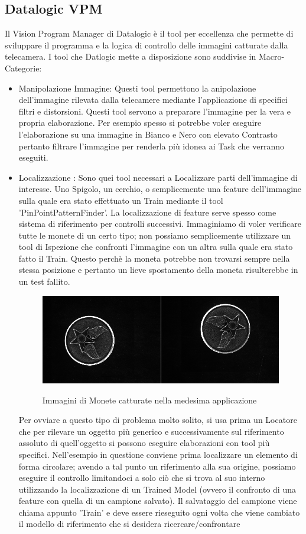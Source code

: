 \documentclass[12pt, a4paper, oneside]{book}
\begin{document}
\subsection{Datalogic VPM}
Il Vision Program Manager di Datalogic è il tool per eccellenza che permette di sviluppare il programma e la logica di controllo delle immagini catturate dalla telecamera. I tool che Datlogic mette a disposizione sono suddivise in Macro-Categorie:
\begin{itemize}
\item Manipolazione Immagine: Questi tool permettono la anipolazione dell'immagine rilevata dalla telecamere mediante l'applicazione di specifici filtri e distorsioni. Questi tool servono a preparare l'immagine per la vera e propria elaborazione. Per esempio spesso si potrebbe voler eseguire l'elaborazione su una immagine in Bianco e Nero con elevato Contrasto pertanto filtrare l'immagine per renderla più idonea ai Task che verranno eseguiti. 
	\item Localizzazione : Sono quei tool necessari a Localizzare parti dell'immagine di interesse. Uno Spigolo, un cerchio, o semplicemente una feature dell'immagine sulla quale era stato effettuato un Train mediante il tool 'PinPointPatternFinder'. La localizzazione di feature serve spesso come sistema di riferimento per controlli successivi. Immaginiamo di voler verificare tutte le monete di un certo tipo; non possiamo semplicemente utilizzare un tool di Ispezione che confronti l'immagine con un altra sulla quale era stato fatto il Train. Questo perchè la moneta potrebbe non trovarsi sempre nella stessa posizione e pertanto un lieve spostamento della moneta risulterebbe in un test fallito.
	
	\begin{figure}[H]
		\centering
		\includegraphics[width=13cm]{Immagini/VIS1}
		\label{vis1}
		\caption{Immagini di Monete catturate nella medesima applicazione}
	\end{figure}

	Per ovviare a questo tipo di problema molto solito, si usa prima un Locatore che per rilevare un oggetto più generico e successivamente sul riferimento assoluto di quell'oggetto si possono eseguire elaborazioni con tool più specifici. Nell'esempio in questione conviene prima localizzare un elemento di forma circolare; avendo a tal punto un riferimento alla sua origine, possiamo eseguire il controllo limitandoci a solo ciò che si trova al suo interno utilizzando la localizzazione di un Trained Model (ovvero il confronto di una feature con quella di un campione salvato). Il salvataggio del campione viene chiama appunto 'Train' e deve essere rieseguito ogni volta che viene cambiato il modello di riferimento che si desidera ricercare/confrontare
	

\end{itemize}
\end{document}
